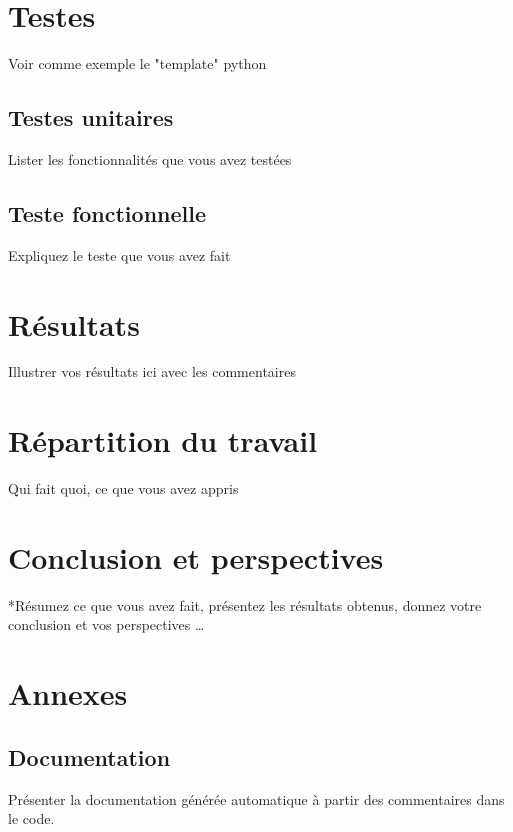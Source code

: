 \documentclass[french]{report}
\begin{document}
\chapter{Testes}
Voir comme exemple le "template" python 
\section{Testes unitaires}
Lister les fonctionnalités que vous avez testées
\section{Teste fonctionnelle}
Expliquez le teste que vous avez fait

\chapter{Résultats}
Illustrer vos résultats ici avec les commentaires

\chapter{Répartition du travail}
Qui fait quoi, ce que vous avez appris 

\chapter{Conclusion et perspectives}
*Résumez ce que vous avez fait, présentez les résultats obtenus, donnez votre
conclusion et vos perspectives \dots *

\chapter*{Annexes}
\section{Documentation}
Présenter la documentation générée automatique à partir des commentaires dans le code.
\end{document}
